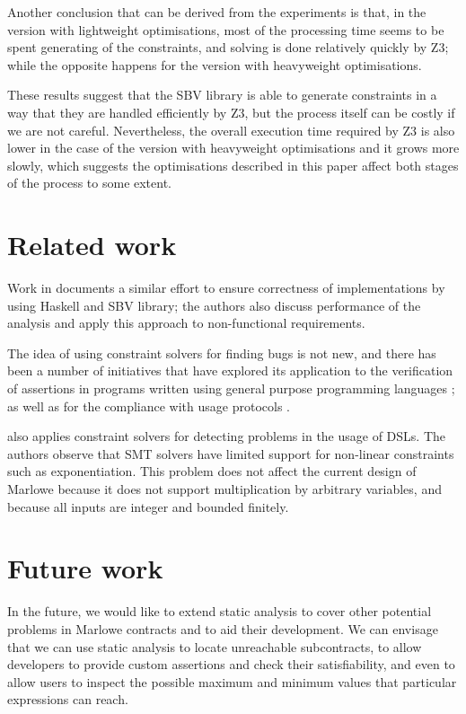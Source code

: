 \documentclass[english,runningheads]{llncs}
\begin{document}
Another conclusion that can be derived from the experiments is that, in the
version with lightweight optimisations, most of the processing time seems to be
spent generating of the constraints, and solving is done relatively
quickly by Z3; while the opposite happens for the version with heavyweight
optimisations.

These results suggest that the SBV library is able to generate constraints in a way
that they are handled efficiently by Z3, but the process itself can be costly
if we are not careful. Nevertheless, the overall execution time required by Z3
is also lower in the case of the version with heavyweight optimisations and it
grows more slowly, which suggests the optimisations described in this paper
affect both stages of the process to some extent.

\section{Related work}

Work in \cite{mokhov2019formal} documents a similar effort to ensure
correctness of implementations by using Haskell and SBV library; the
authors also discuss performance of the analysis and apply this approach
to non-functional requirements.

The idea of using constraint solvers for finding bugs is not new,
and there has been a number of initiatives that have explored its
application to the verification of assertions in programs written
using general purpose programming languages \cite{gulwani2008program,jackson2000finding};
as well as for the compliance with usage protocols
\cite{ball2001automatically,xie2005saturn}.

\cite{keshishzadeh2013early} also applies constraint solvers for
detecting problems in the usage of DSLs. The authors observe that
SMT solvers have limited support for non-linear constraints such as
exponentiation. This problem does not affect the current design of
Marlowe because it does not support multiplication by arbitrary variables,
and because all inputs are integer and bounded finitely.

\section{Future work}

In the future, we would like to extend static analysis to cover other
potential problems in Marlowe contracts and to aid their development.
We can envisage that we can use static analysis to locate unreachable
subcontracts, to allow developers to provide custom assertions and
check their satisfiability, and even to allow users to inspect the
possible maximum and minimum values that particular expressions can
reach. 
\end{document}
